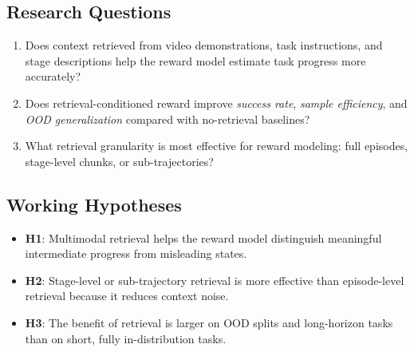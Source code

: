 \subsection{Research Questions}

\begin{enumerate}
  \item Does context retrieved from video demonstrations, task instructions, and stage descriptions help the reward model estimate task progress more accurately?
  \item Does retrieval-conditioned reward improve \textit{success rate}, \textit{sample efficiency}, and \textit{OOD generalization} compared with no-retrieval baselines?
  \item What retrieval granularity is most effective for reward modeling: full episodes, stage-level chunks, or sub-trajectories?
\end{enumerate}

\subsection{Working Hypotheses}

\begin{itemize}
  \item \textbf{H1}: Multimodal retrieval helps the reward model distinguish meaningful intermediate progress from misleading states.
  \item \textbf{H2}: Stage-level or sub-trajectory retrieval is more effective than episode-level retrieval because it reduces context noise.
  \item \textbf{H3}: The benefit of retrieval is larger on OOD splits and long-horizon tasks than on short, fully in-distribution tasks.
\end{itemize}
